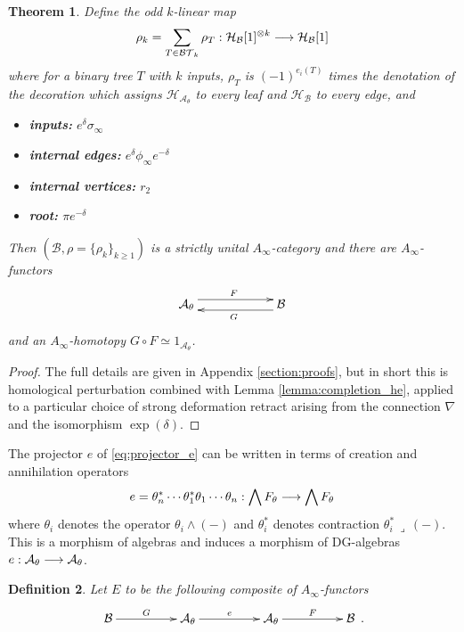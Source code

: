 \documentclass[english,letter paper,12pt,leqno]{article}
\newtheorem{theorem}{Theorem}[section]
\theoremstyle{example}
\newtheorem{definition}[theorem]{Definition}
\numberwithin{equation}{section}
\def\AA{\mathcal{A}}
\def\BB{\mathcal{B}}
\def\HH{\HH}
\def\HH{\mathcal{H}}
\def\be{\begin{equation}}
\def\ee{\end{equation}}
\begin{document}
\begin{theorem}\label{theorem:main_ainfty_products} Define the odd $k$-linear map
\be\label{eq:rho_kintermsoftrees}
\rho_k = \sum_{T \in \cat{BT}_k} \rho_T : \HH_{\BB}[1]^{\otimes k} \lto \HH_{\BB}[1]
\ee
where for a binary tree $T$ with $k$ inputs, $\rho_T$ is $(-1)^{e_i(T)}$ times the denotation of the decoration which assigns $\HH_{\AA_\theta}$ to every leaf and $\HH_{\BB}$ to every edge, and
\begin{center}
\begin{itemize}
\item \textbf{inputs:} $e^\delta \sigma_\infty$
\item \textbf{internal edges:} $e^\delta \phi_\infty e^{-\delta}$
\item \textbf{internal vertices:} $r_2$
\item \textbf{root:} $\pi e^{-\delta}$
\end{itemize}
\end{center}
Then $( \BB, \rho = \{ \rho_k \}_{k \ge 1} )$ is a strictly unital $A_\infty$-category and there are $A_\infty$-functors
\[
\xymatrix@C+3pc{
\AA_\theta \ar@<1ex>[r]^F & \BB \ar@<1ex>[l]^G
}
\]
and an $A_\infty$-homotopy $G \circ F \simeq 1_{\AA_{\theta}}$. %
\end{theorem}
\begin{proof}
The full details are given in Appendix \ref{section:proofs}, but in short this is homological perturbation combined with Lemma \ref{lemma:completion_he}, applied to a particular choice of strong deformation retract arising from the connection $\nabla$ and the isomorphism $\exp(\delta)$.
\end{proof}

The projector $e$ of \eqref{eq:projector_e} can be written in terms of creation and annihilation operators
\[
e = \theta_n^* \cdots \theta_1^* \theta_1 \cdots \theta_n: \bigwedge F_\theta \longrightarrow \bigwedge F_\theta
\]
where $\theta_i$ denotes the operator $\theta_i \wedge (-)$ and $\theta_i^*$ denotes contraction $\theta_i^* \,\lrcorner\, (-)$. This is a morphism of algebras and induces a morphism of DG-algebras $e: \AA_\theta \lto \AA_\theta$.

\begin{definition} Let $E$ to be the following composite of $A_\infty$-functors 
\[
\xymatrix@C+2pc{
\BB \ar[r]^-G & \AA_\theta \ar[r]^-{e} & \AA_\theta \ar[r]^-F & \BB
}\,.
\]
\end{definition}
\end{document}
